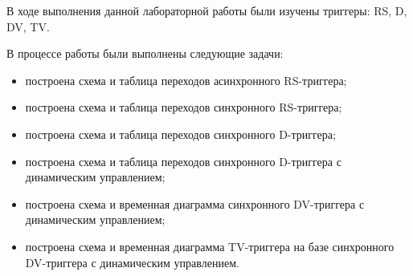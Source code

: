 \Conclusion

В ходе выполнения данной лабораторной работы были изучены триггеры: RS, D, DV, TV. 

В процессе работы были выполнены следующие задачи:

\begin{itemize}[$\bullet$]
    \item построена схема и таблица переходов асинхронного RS-триггера;
    \item построена схема и таблица переходов синхронного RS-триггера;
    \item построена схема и таблица переходов синхронного D-триггера;
    \item построена схема и таблица переходов синхронного D-триггера с динамическим управлением;
    \item построена схема и временная диаграмма синхронного DV-триггера с динамическим управлением;
    \item построена схема и временная диаграмма TV-триггера на базе синхронного DV-триггера с динамическим управлением.
\end{itemize}
